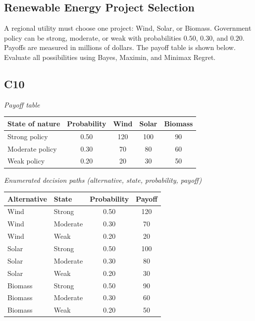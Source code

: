 \begin{ExamProblems}
		\item
		\subsection*{Renewable Energy Project Selection}
		A regional utility must choose one project: Wind, Solar, or Biomass.
		Government policy can be strong, moderate, or weak with probabilities $0.50$, $0.30$, and $0.20$.
		Payoffs are measured in millions of dollars. The payoff table is shown below. Evaluate all possibilities using Bayes, Maximin, and Minimax Regret.
		
		\subsection*{C10}
		\begin{center}
			\textit{Payoff table} \\
			\begin{tabular}{l c c c c}
				\toprule
				State of nature & Probability & Wind & Solar & Biomass \\
				\midrule
				Strong policy & 0.50 & 120 & 100 & 90 \\
				Moderate policy & 0.30 & 70 & 80 & 60 \\
				Weak policy & 0.20 & 20 & 30 & 50 \\
				\bottomrule
			\end{tabular}
		\end{center}
		
		\textit{Enumerated decision paths (alternative, state, probability, payoff)}
		\begin{center}
			\begin{tabular}{l l c c}
				\toprule
				Alternative & State & Probability & Payoff \\
				\midrule
				Wind & Strong & 0.50 & 120 \\
				Wind & Moderate & 0.30 & 70 \\
				Wind & Weak & 0.20 & 20 \\
				Solar & Strong & 0.50 & 100 \\
				Solar & Moderate & 0.30 & 80 \\
				Solar & Weak & 0.20 & 30 \\
				Biomass & Strong & 0.50 & 90 \\
				Biomass & Moderate & 0.30 & 60 \\
				Biomass & Weak & 0.20 & 50 \\
				\bottomrule
			\end{tabular}
		\end{center}
		

\end{ExamProblems}
